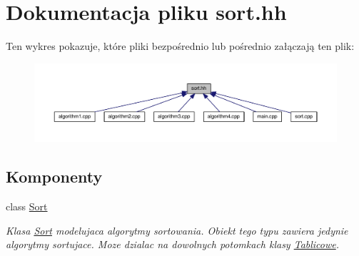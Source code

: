 \hypertarget{sort_8hh}{\section{Dokumentacja pliku sort.\-hh}
\label{sort_8hh}
}
Ten wykres pokazuje, które pliki bezpośrednio lub pośrednio załączają ten plik\-:\nopagebreak
\begin{figure}[H]
\begin{center}
\leavevmode
\includegraphics[width=350pt]{sort_8hh__dep__incl}
\end{center}
\end{figure}
\subsection*{Komponenty}
\begin{DoxyCompactItemize}
\item 
class \hyperlink{class_sort}{Sort}
\begin{DoxyCompactList}\small\item\em Klasa \hyperlink{class_sort}{Sort} modelujaca algorytmy sortowania. Obiekt tego typu zawiera jedynie algorytmy sortujace. Moze dzialac na dowolnych potomkach klasy \hyperlink{class_tablicowe}{Tablicowe}. \end{DoxyCompactList}\end{DoxyCompactItemize}
